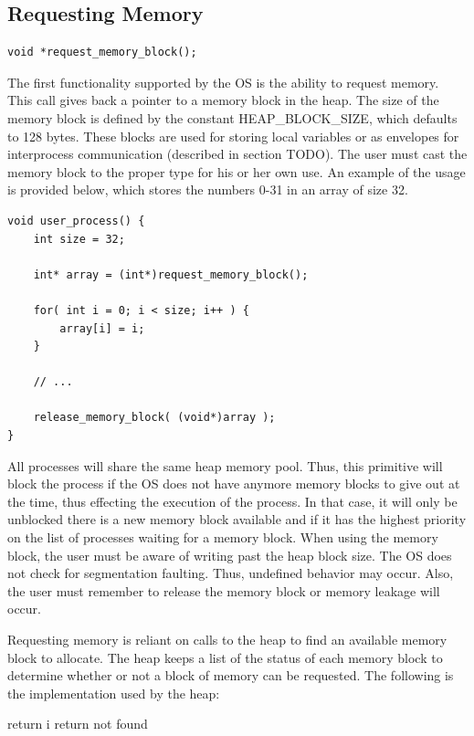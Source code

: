 \documentclass[12pt]{report}
\begin{document}
\subsection{Requesting Memory}
\label{sec:request_memory}
\begin{lstlisting}
void *request_memory_block();
\end{lstlisting}
\par The first functionality supported by the OS is the ability to request memory. This call gives back a pointer to a memory block in the heap. The size of the memory block is defined by the constant HEAP\_BLOCK\_SIZE, which defaults to 128 bytes. These blocks are used for storing local variables or as envelopes for interprocess communication (described in section TODO). The user must cast the memory block to the proper type for his or her own use. An example of the usage is provided below, which stores the numbers 0-31 in an array of size 32.
\begin{lstlisting}
void user_process() {
    int size = 32;

    int* array = (int*)request_memory_block();

    for( int i = 0; i < size; i++ ) {
        array[i] = i;
    }

    // ...

    release_memory_block( (void*)array );
}
\end{lstlisting}

\par All processes will share the same heap memory pool. Thus, this primitive will block the process if the OS does not have anymore memory blocks to give out at the time, thus effecting the execution of the process. In that case, it will only be unblocked there is a new memory block available and if it has the highest priority on the list of processes waiting for a memory block. When using the memory block, the user must be aware of writing past the heap block size. The OS does not check for segmentation faulting. Thus, undefined behavior may occur. Also, the user must remember to release the memory block or memory leakage will occur.

\par Requesting memory is reliant on calls to the heap to find an available memory block to allocate. The heap keeps a list of the status of each memory block to determine whether or not a block of memory can be requested. The following is the implementation used by the heap:
\begin{algorithmic}
        \State return i
      \EndIf
    \EndFor
  \State return not found
  \EndFunction
\end{algorithmic}
\end{document}
